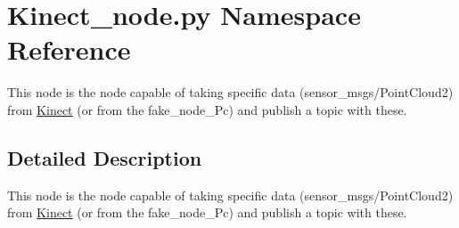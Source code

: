 \hypertarget{namespaceKinect__node_1_1py}{}\section{Kinect\+\_\+node.\+py Namespace Reference}
\label{namespaceKinect__node_1_1py}


This node is the node capable of taking specific data (sensor\+\_\+msgs/\+Point\+Cloud2) from \hyperlink{classKinect__node_1_1Kinect}{Kinect} (or from the fake\+\_\+node\+\_\+\+Pc) and publish a topic with these.  




\subsection{Detailed Description}
This node is the node capable of taking specific data (sensor\+\_\+msgs/\+Point\+Cloud2) from \hyperlink{classKinect__node_1_1Kinect}{Kinect} (or from the fake\+\_\+node\+\_\+\+Pc) and publish a topic with these. 


